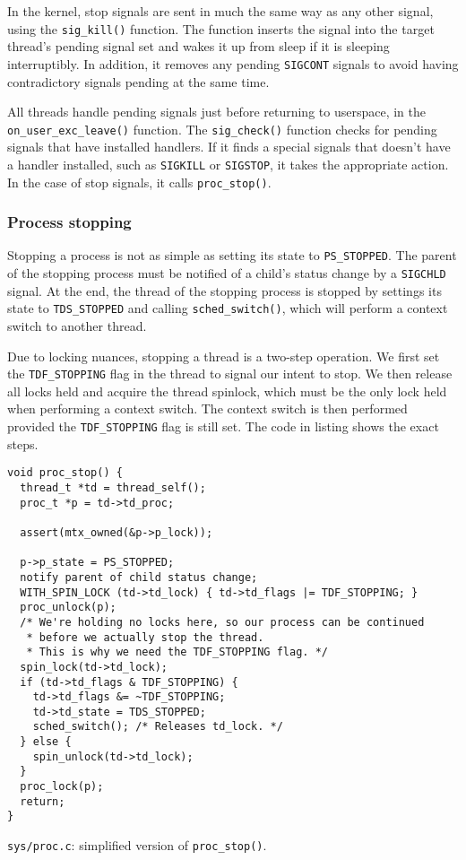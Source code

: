 \documentclass[shortabstract, manyadvisors, english, mgr]{iithesis}
\begin{document}
In the kernel, stop signals are sent in much the same way as any other signal,
using the \texttt{sig\_kill()} function. The function inserts the signal into
the target thread's pending signal set and wakes it up from sleep if it is
sleeping interruptibly. In addition, it removes any pending \texttt{SIGCONT}
signals to avoid having contradictory signals pending at the same time.

All threads handle pending signals just before returning to userspace, in the
\texttt{on\_user\_exc\_leave()} function. The \texttt{sig\_check()} function checks
for pending signals that have installed handlers. If it finds a special signals
that doesn't have a handler installed, such as \texttt{SIGKILL} or
\texttt{SIGSTOP}, it takes the appropriate action. In the case of stop signals,
it calls \texttt{proc\_stop()}.

\subsubsection{Process stopping}

Stopping a process is not as simple as setting its state to
\texttt{PS\_STOPPED}. The parent of the stopping process must be notified of a
child's status change by a \texttt{SIGCHLD} signal. At the end, the thread of
the stopping process is stopped by settings its state to \texttt{TDS\_STOPPED}
and calling \texttt{sched\_switch()}, which will perform a context switch to
another thread.

Due to locking nuances, stopping a thread is a two-step operation. We first set
the \texttt{TDF\_STOPPING} flag in the thread to signal our intent to stop. We
then release all locks held and acquire the thread spinlock, which must be the
only lock held when performing a context switch. The context switch is then
performed provided the \texttt{TDF\_STOPPING} flag is still set. The code in
listing shows the exact steps.

\begin{listing}[H]
\begin{verbatim}
void proc_stop() {
  thread_t *td = thread_self();
  proc_t *p = td->td_proc;

  assert(mtx_owned(&p->p_lock));

  p->p_state = PS_STOPPED;
  notify parent of child status change;
  WITH_SPIN_LOCK (td->td_lock) { td->td_flags |= TDF_STOPPING; }
  proc_unlock(p);
  /* We're holding no locks here, so our process can be continued
   * before we actually stop the thread.
   * This is why we need the TDF_STOPPING flag. */
  spin_lock(td->td_lock);
  if (td->td_flags & TDF_STOPPING) {
    td->td_flags &= ~TDF_STOPPING;
    td->td_state = TDS_STOPPED;
    sched_switch(); /* Releases td_lock. */
  } else {
    spin_unlock(td->td_lock);
  }
  proc_lock(p);
  return;
}
\end{verbatim}
\caption{\texttt{sys/proc.c}: simplified version of \texttt{proc\_stop()}.}
\end{listing}
\end{document}
